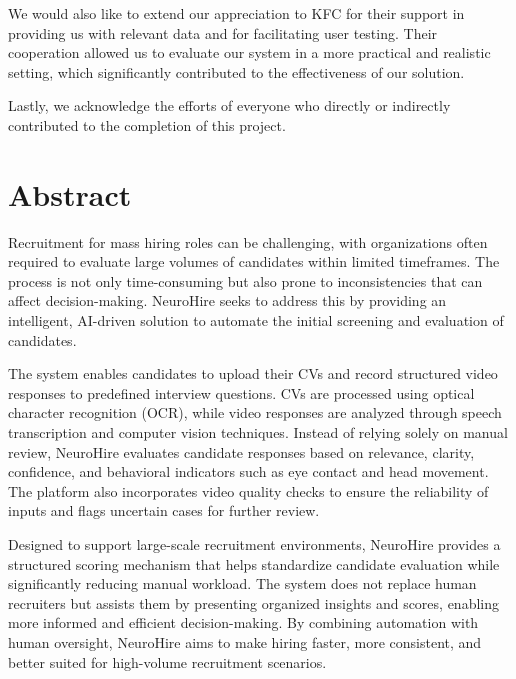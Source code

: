 \documentclass[12pt,twosided]{report}
\begin{document}
We would also like to extend our appreciation to KFC for their support in providing us with relevant data and for facilitating user testing. Their cooperation allowed us to evaluate our system in a more practical and realistic setting, which significantly contributed to the effectiveness of our solution.

Lastly, we acknowledge the efforts of everyone who directly or indirectly contributed to the completion of this project.

\chapter*{Abstract}
Recruitment for mass hiring roles can be challenging, with organizations often required to evaluate large volumes of candidates within limited timeframes. The process is not only time-consuming but also prone to inconsistencies that can affect decision-making. NeuroHire seeks to address this by providing an intelligent, AI-driven solution to automate the initial screening and evaluation of candidates.

The system enables candidates to upload their CVs and record structured video responses to predefined interview questions. CVs are processed using optical character recognition (OCR), while video responses are analyzed through speech transcription and computer vision techniques. Instead of relying solely on manual review, NeuroHire evaluates candidate responses based on relevance, clarity, confidence, and behavioral indicators such as eye contact and head movement. The platform also incorporates video quality checks to ensure the reliability of inputs and flags uncertain cases for further review.

Designed to support large-scale recruitment environments, NeuroHire provides a structured scoring mechanism that helps standardize candidate evaluation while significantly reducing manual workload. The system does not replace human recruiters but assists them by presenting organized insights and scores, enabling more informed and efficient decision-making. By combining automation with human oversight, NeuroHire aims to make hiring faster, more consistent, and better suited for high-volume recruitment scenarios.

\tableofcontents
\listoffigures
\listoftables
\end{document}

